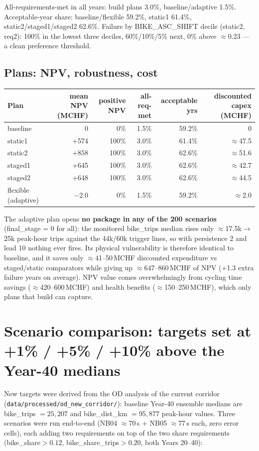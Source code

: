 \documentclass[10pt,a4paper]{article}
\begin{document}
All-requirements-met in all years: build plans 3.0\%, baseline/adaptive 1.5\%.
Acceptable-year share: baseline/flexible 59.2\%, static1 61.4\%, static2/staged1/staged2 62.6\%.
Failure by BIKE\_ASC\_SHIFT decile (static2, req2): 100\% in the lowest three deciles,
60\%/10\%/5\% next, 0\% above $\approx$0.23 --- a clean preference threshold.

\subsection{Plans: NPV, robustness, cost}
\begin{center}\small\begin{tabular}{@{}lrrrrr@{}}
\toprule
Plan & mean NPV (MCHF) & positive NPV & all-req-met & acceptable yrs & discounted capex (MCHF) \\
\midrule
baseline & 0 & 0\% & 1.5\% & 59.2\% & 0 \\
static1 & +574 & 100\% & 3.0\% & 61.4\% & $\approx$47.5 \\
static2 & +858 & 100\% & 3.0\% & 62.6\% & $\approx$51.6 \\
staged1 & +645 & 100\% & 3.0\% & 62.6\% & $\approx$42.7 \\
staged2 & +648 & 100\% & 3.0\% & 62.6\% & $\approx$44.5 \\
flexible (adaptive) & $-$2.0 & 0\% & 1.5\% & 59.2\% & $\approx$2.0 \\
\bottomrule
\end{tabular}\end{center}

The adaptive plan opens \textbf{no package in any of the 200 scenarios}
(final\_stage = 0 for all): the monitored bike\_trips median rises only
$\approx$17.5k$\to$25k peak-hour trips against the 44k/60k trigger lines, so with
persistence 2 and lead 10 nothing ever fires. Its physical vulnerability is therefore
identical to baseline, and it saves only $\approx$41--50\,MCHF discounted expenditure vs
staged/static comparators while giving up $\approx$647--860\,MCHF of NPV ($+$1.3 extra
failure years on average). NPV value comes overwhelmingly from cycling time savings
($\approx$420--600\,MCHF) and health benefits ($\approx$150--250\,MCHF), which only plans
that build can capture.

\section{Scenario comparison: targets set at +1\% / +5\% / +10\% above the Year-40 medians}
New targets were derived from the OD analysis of the current corridor
(\texttt{data/processed/od\_new\_corridor/}): baseline Year-40 ensemble medians are
bike\_trips $=25{,}207$ and bike\_dist\_km $=95{,}877$ peak-hour values. Three scenarios
were run end-to-end (NB04 $\approx$70\,s + NB05 $\approx$77\,s each, zero error cells),
each adding two requirements on top of the two share requirements
(bike\_share${}>0.12$, bike\_share\_trips${}>0.20$, both Years 20--40):
\end{document}

